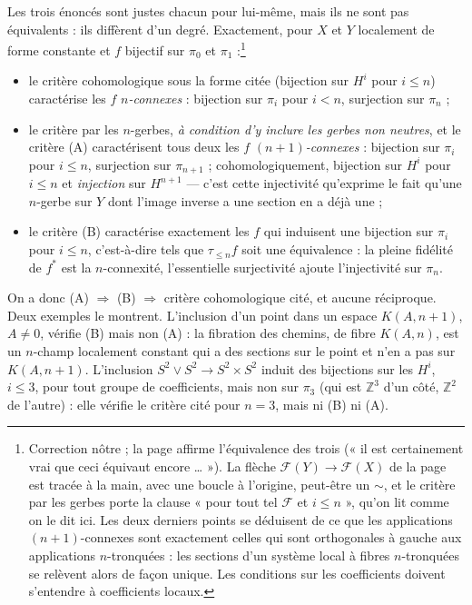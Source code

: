 \documentclass[11pt,a4paper]{article}
\begin{document}
Les trois énoncés sont justes chacun pour lui-même, mais ils ne sont pas
équivalents : ils diffèrent d'un degré. Exactement, pour $X$ et $Y$
localement de forme constante et $f$ bijectif sur $\pi_0$ et
$\pi_1$ :\footnote{Correction nôtre ; la page affirme l'équivalence des
trois (« il est certainement vrai que ceci équivaut encore … »). La flèche
$\mathcal{F}(Y)\to\mathcal{F}(X)$ de la page est tracée à la main, avec une
boucle à l'origine, peut-être un $\sim$, et le critère par les gerbes porte
la clause « pour tout tel $\mathcal{F}$ et $i \leqslant n$ », qu'on lit
comme on le dit ici. Les deux derniers points se déduisent de ce que les
applications $(n+1)$-connexes sont exactement celles qui sont orthogonales
à gauche aux applications $n$-tronquées : les sections d'un système local à
fibres $n$-tronquées se relèvent alors de façon unique. Les conditions sur
les coefficients doivent s'entendre à coefficients locaux.}
\begin{itemize}
  \item le critère cohomologique sous la forme citée (bijection sur $H^i$
  pour $i \leqslant n$) caractérise les $f$ \emph{$n$-connexes} : bijection
  sur $\pi_i$ pour $i < n$, surjection sur $\pi_n$ ;
  \item le critère par les $n$-gerbes, \emph{à condition d'y inclure les
  gerbes non neutres}, et le critère (A) caractérisent tous deux les $f$
  \emph{$(n+1)$-connexes} : bijection sur $\pi_i$ pour $i \leqslant n$,
  surjection sur $\pi_{n+1}$ ; cohomologiquement, bijection sur $H^i$ pour
  $i \leqslant n$ et \emph{injection} sur $H^{n+1}$ --- c'est cette
  injectivité qu'exprime le fait qu'une $n$-gerbe sur $Y$ dont l'image
  inverse a une section en a déjà une ;
  \item le critère (B) caractérise exactement les $f$ qui induisent une
  bijection sur $\pi_i$ pour $i \leqslant n$, c'est-à-dire tels que
  $\tau_{\leqslant n}f$ soit une équivalence : la pleine fidélité de $f^*$
  est la $n$-connexité, l'essentielle surjectivité ajoute l'injectivité sur
  $\pi_n$.
\end{itemize}
On a donc (A) $\Rightarrow$ (B) $\Rightarrow$ critère cohomologique cité,
et aucune réciproque. Deux exemples le montrent. L'inclusion d'un point
dans un espace $K(A,n+1)$, $A \neq 0$, vérifie (B) mais non (A) : la
fibration des chemins, de fibre $K(A,n)$, est un $n$-champ localement
constant qui a des sections sur le point et n'en a pas sur $K(A,n+1)$.
L'inclusion $S^2\vee S^2 \to S^2\times S^2$ induit des bijections sur les
$H^i$, $i \leqslant 3$, pour tout groupe de coefficients, mais non sur
$\pi_3$ (qui est $\mathbb{Z}^3$ d'un côté, $\mathbb{Z}^2$ de l'autre) : elle
vérifie le critère cité pour $n = 3$, mais ni (B) ni (A).
\end{document}
